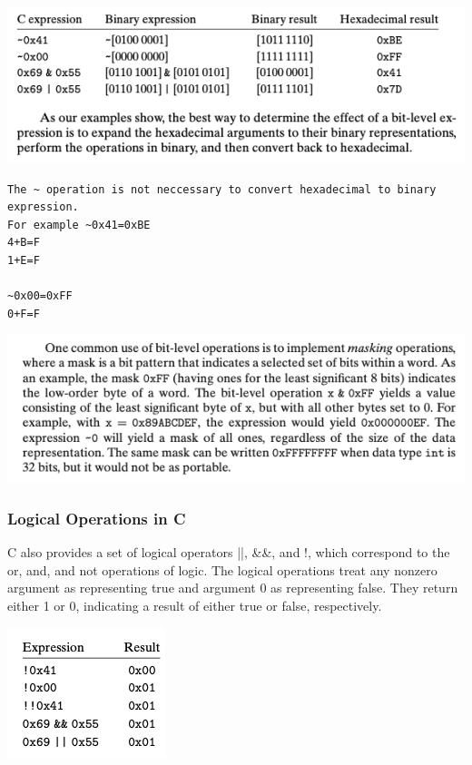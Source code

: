 \documentclass[11pt]{article}
\begin{document}
\begin{center}
\includegraphics[width=.9\linewidth]{pics/bit-level-operation.png}
\end{center}

\begin{verbatim}
The ~ operation is not neccessary to convert hexadecimal to binary expression.
For example ~0x41=0xBE
4+B=F
1+E=F

~0x00=0xFF
0+F=F
\end{verbatim}


\begin{center}
\includegraphics[width=.9\linewidth]{pics/mask.png}
\end{center}



\subsubsection{Logical Operations in C}
\label{sec:org4d9f716}
C also provides a set of logical operators ||, \&\&, and !, which correspond to the or, and, and not operations of logic. The logical operations treat any nonzero argument as representing true and argument 0 as representing false. They return either 1 or 0, indicating a result of either true or false, respectively.\\

\begin{center}
\includegraphics[width=.9\linewidth]{pics/logical-operations.png}
\end{center}
\end{document}
